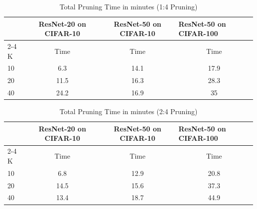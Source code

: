 \documentclass[11pt]{extreport}
\begin{document}
			\begin{table}[H]
				\centering
				\caption{Total Pruning Time in minutes (1:4 Pruning)}
				\begin{tabular}{lccc} 
					\toprule
					& ResNet-20 on CIFAR-10 & ResNet-50 on CIFAR-10 & \multicolumn{1}{l}{ResNet-50 on CIFAR-100}  \\ 
					\cmidrule{2-4}
					K  & Time                 & Time                 & Time                                       \\ 
					\midrule
					10 & 6.3            & 14.1           & 17.9                                 \\
					20 & 11.5           & 16.3           & 28.3                                 \\
					40 & 24.2           & 16.9           & 35                                   \\
					\bottomrule
				\end{tabular}
				\label{table4}
			\end{table}



			\begin{table}[H]
				\centering
				\caption{Total Pruning Time in minutes (2:4 Pruning)}
				\begin{tabular}{lccc} 
					\toprule
					& ResNet-20 on CIFAR-10 & ResNet-50 on CIFAR-10 & \multicolumn{1}{l}{ResNet-50 on CIFAR-100}  \\ 
					\cmidrule{2-4}
					K  & Time                 & Time                 & Time                                       \\ 
					\midrule
					10 & 6.8            & 12.9           & 20.8                                 \\
					20 & 14.5           & 15.6            & 37.3                                    \\
					40 & 13.4           & 18.7           & 44.9                                \\
					\bottomrule
				\end{tabular}
				\label{table5}
			\end{table}
\end{document}
